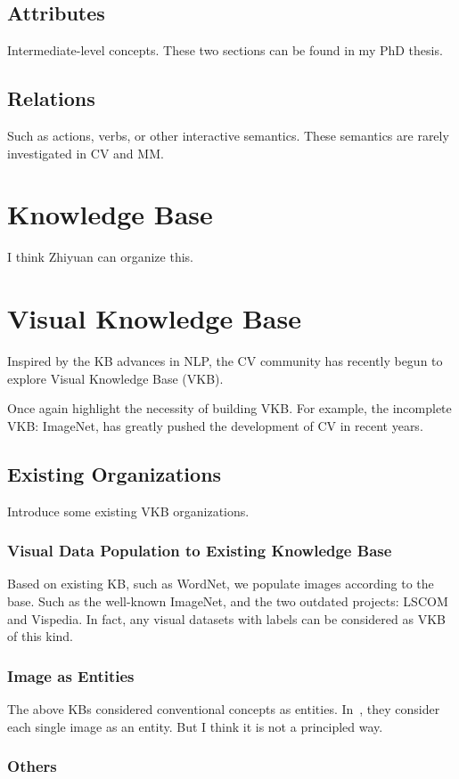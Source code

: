 \subsection{Attributes}
Intermediate-level concepts. These two sections can be found in my PhD thesis.
\subsection{Relations}
Such as actions, verbs, or other interactive semantics. These semantics are rarely investigated in CV and MM.

\section{Knowledge Base}\label{sec:3}
I think Zhiyuan can organize this.

\section{Visual Knowledge Base}\label{sec:4}
Inspired by the KB advances in NLP, the CV community has recently begun to explore Visual Knowledge Base (VKB).

Once again highlight the necessity of building VKB. For example, the incomplete VKB: ImageNet, has greatly pushed the development of CV in recent years.

\subsection{Existing Organizations}\label{sec:4_1}
Introduce some existing VKB organizations.
\subsubsection{Visual Data Population to Existing Knowledge Base}\label{sec:4_1_1}
Based on existing KB, such as WordNet, we populate images according to the base. Such as the well-known ImageNet, and the two outdated projects: LSCOM and Vispedia. In fact, any visual datasets with labels can be considered as VKB of this kind.
\subsubsection{Image as Entities}\label{sec:4_1_3}
The above KBs considered conventional concepts as entities. In~\cite{zhu2015building}, they consider each single image as an entity. But I think it is not a principled way.
\subsubsection{Others}\label{sec:4_1_4}



